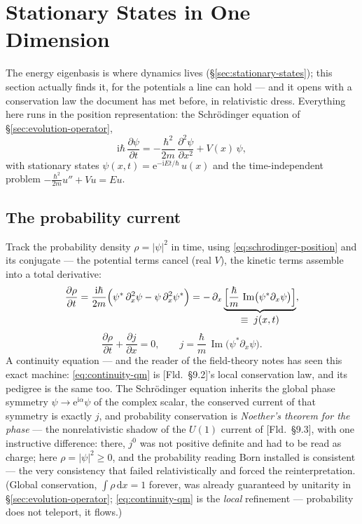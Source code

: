 \documentclass[11pt]{article}
\theoremstyle{plain}
\theoremstyle{definition}
\theoremstyle{remark}
\newcommand{\dd}{\mathrm{d}}
\newcommand{\ee}{\mathrm{e}}
\newcommand{\ii}{\mathrm{i}}
\newcommand{\pd}[2]{\frac{\partial #1}{\partial #2}}
\begin{document}
\section{Stationary States in One Dimension}
\label{sec:one-dim}

The energy eigenbasis is where dynamics lives
(\S\ref{sec:stationary-states}); this section actually finds it, for
the potentials a line can hold --- and it opens with a conservation
law the document has met before, in relativistic dress. Everything
here runs in the position representation: the Schr\"odinger equation
of \S\ref{sec:evolution-operator},
\begin{equation}
  \ii\hbar\,\pd\psi t
  = -\frac{\hbar^2}{2m}\,\pd{^2\psi}{x^2}
  + V(x)\,\psi ,
  \label{eq:schrodinger-position}
\end{equation}
with stationary states $\psi(x, t) = \ee^{-\ii E t/\hbar}\,u(x)$ and
the time-independent problem $-\tfrac{\hbar^2}{2m}u'' + Vu = Eu$.

\subsection{The probability current}
\label{sec:probability-current}

Track the probability density $\rho = |\psi|^2$ in time, using
\eqref{eq:schrodinger-position} and its conjugate --- the potential
terms cancel (real $V$), the kinetic terms assemble into a total
derivative:
\begin{equation}
  \pd\rho t
  = \frac{\ii\hbar}{2m}\Bigl(
      \psi^{*}\,\partial_x^2\psi
      - \psi\,\partial_x^2\psi^{*}
    \Bigr)
  = -\,\partial_x
    \underbrace{\Bigl[
      \frac{\hbar}{m}\,
      \operatorname{Im}\bigl(\psi^{*}\partial_x\psi\bigr)
    \Bigr]}_{\displaystyle \equiv\; j(x, t)} ,
\end{equation}
\begin{equation}
  \boxed{\;
  \pd\rho t + \pd jx = 0,
  \qquad
  j = \frac{\hbar}{m}\,
      \operatorname{Im}\bigl(\psi^{*}\partial_x\psi\bigr) .
  \;}
  \label{eq:continuity-qm}
\end{equation}
A continuity equation --- and the reader of the field-theory notes
has seen this exact machine: \eqref{eq:continuity-qm} is
[Fld.\ \S9.2]'s local conservation law, and its pedigree is the same
too. The Schr\"odinger equation inherits the global phase symmetry
$\psi \to \ee^{\ii\alpha}\psi$ of the complex scalar, the conserved
current of that symmetry is exactly $j$, and probability
conservation is \emph{Noether's theorem for the phase} --- the
nonrelativistic shadow of the $U(1)$ current of [Fld.\ \S9.3], with
one instructive difference: there, $j^0$ was not positive definite
and had to be read as charge; here $\rho = |\psi|^2 \ge 0$, and the
probability reading Born installed is consistent --- the very
consistency that failed relativistically and forced the
reinterpretation. (Global conservation, $\int\rho\,\dd x = 1$
forever, was already guaranteed by unitarity in
\S\ref{sec:evolution-operator}; \eqref{eq:continuity-qm} is the
\emph{local} refinement --- probability does not teleport, it
flows.)
\end{document}
